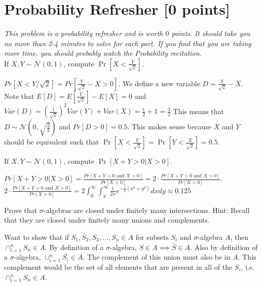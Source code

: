 \newpage

\section{Probability Refresher [0 points]}

 \emph{This problem is a probability refresher and is worth $0$ points. It should take you no more than 2-4 minutes to solve for each part. If you find that you are taking more time, you should probably watch the Probability recitation.}\\

\problem[0] If $X, Y \sim \mathcal{N}(0, 1)$, compute $\Pr[X < \frac{Y}{\sqrt{2}}]$.\\


\begin{solution}
  $Pr[X < Y/\sqrt{2}] = Pr[\frac{Y}{\sqrt{2}} - X > 0]$. We define a new variable $D = \frac{Y}{\sqrt{2}} - X$. Note that $E[D] = E[\frac{Y}{\sqrt{2}}] - E[X] = 0$ and $Var(D) = (\frac{1}{\sqrt{2}})^2 Var(Y) + Var(X) = \frac{1}{2} + 1 = \frac{3}{2}$
  This means that $D \sim \mathcal{N}(0, \sqrt{\frac{3}{2}})$ and $Pr[D > 0] = 0.5$. This makes sense because $X$ and $Y$ should be equivalent such that $\Pr[X < \frac{Y}{\sqrt{2}}] = \Pr[Y < \frac{X}{\sqrt{2}}] = 0.5$.
\end{solution}

\vspace{0.5cm}

\problem[0] If $X, Y \sim \mathcal{N}(0, 1)$, compute $\Pr[X+Y>0 | X>0]$. \\

\begin{solution}
  $Pr[X+Y>0 | X>0] = \frac{Pr[X + Y > 0 \text{ and } X > 0]}{Pr[X>0]} = 2 \cdot \frac{Pr[X + Y > 0 \text{ and } X > 0]}{Pr[X>0]}$. \\
  $2 \cdot \frac{Pr[X + Y > 0 \text{ and } X > 0]}{Pr[X>0]} = 2 \int_0^\infty\int_y^\infty \frac{1}{2\pi} e^{-\frac{1}{2}(x^2+y^2)} dx dy \approx 0.125$
\end{solution}

\vspace{0.5cm}

\problem[0] Prove that $\sigma$-algebras are closed under finitely many intersections. Hint: Recall that they are closed under finitely many unions and complements.\\

\begin{solution}
  Want to show that if $S_1, S_2, S_3, ..., S_n \in A$ for subsets $S_i$ and $\sigma$-algebra $A$, then $\cap_{i = 1}^n S_n \in A$. By definition of a $\sigma$-algebra, $S \in A \implies \bar{S} \in A$. Also by definition of a $\sigma$-algebra, $\cup_{i = 1}^n \bar{S_i} \in A$. The complement of this union must also be in $A$. This complement would be the set of all elements that are present in all of the $S_i$, i.e. $\cap_{i = 1}^n S_n \in A$.
  \qedhere
\end{solution}

